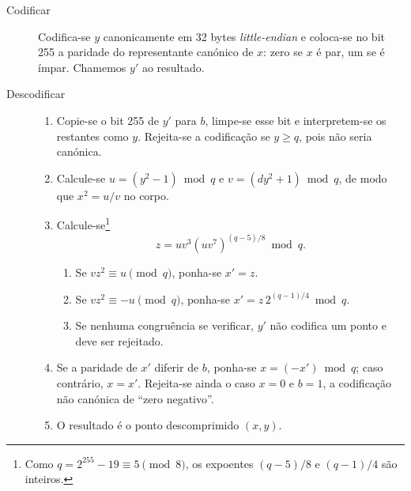\begin{description}
	\item[Codificar] %
Codifica-se \(y\) canonicamente em 32 bytes
    {\em little-endian} e coloca-se no bit 255 a
    paridade do representante canónico de \(x\): zero se \(x\) é par, um se é
    ímpar. Chamemos \(y'\) ao resultado.
	
	\item[Descodificar] \hfill
	    \begin{enumerate}
            \item {}%
Copie-se o bit 255 de \(y'\) para \(b\), limpe-se esse bit e
            interpretem-se os restantes como \(y\). Rejeita-se a codificação
            se \(y\geq q\), pois não seria canónica.

            \item Calcule-se \(u=(y^2-1)\bmod q\) e
            \(v=(dy^2+1)\bmod q\), de modo que \(x^2=u/v\) no corpo.
            \item Calcule-se\footnote{Como
            \(q=2^{255}-19\equiv5\pmod8\), os expoentes \((q-5)/8\) e
            \((q-1)/4\) são inteiros.}
            \[
            z=uv^3(uv^7)^{(q-5)/8}\bmod q.
            \]
            \begin{enumerate}
                \item Se \(vz^2\equiv u\pmod q\), ponha-se \(x'=z\).
                \item Se \(vz^2\equiv-u\pmod q\), ponha-se
                \(x'=z\,2^{(q-1)/4}\bmod q\).
                \item Se nenhuma congruência se verificar, \(y'\) não codifica
                um ponto e deve ser rejeitado.
            \end{enumerate}
            \item Se a paridade de \(x'\) diferir de \(b\), ponha-se
            \(x=(-x')\bmod q\); caso contrário, \(x=x'\). Rejeita-se ainda o
            caso \(x=0\) e \(b=1\), a codificação não canónica de ``zero
            negativo''.
            \item O resultado é o ponto descomprimido \((x,y)\).
	    \end{enumerate}
\end{description}

